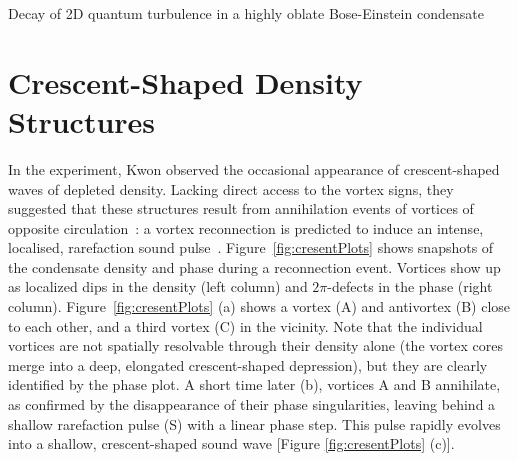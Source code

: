\begin{chapter}{\label{cha:shin}Decay of 2D quantum turbulence in a highly oblate Bose-Einstein condensate}
\section{Crescent-Shaped Density Structures}
In the experiment, Kwon {\etal}observed the occasional appearance of crescent-shaped waves of 
depleted density.  Lacking direct access to the vortex signs,
they suggested that these structures result from
annihilation events of vortices of opposite 
circulation~\citep{nazarenko_onorato_07,rorai_skreenivasan_12,prabhakar_singh_13}: a vortex reconnection is predicted to 
induce an intense, localised, rarefaction 
sound pulse~\cite{leadbeater,zuccher}.  
Figure~\ref{fig:cresentPlots} shows snapshots of the condensate density 
and phase during a reconnection event. Vortices show up as localized dips 
in the density (left column) and $2 \pi$-defects in the phase (right column). 
Figure~\ref{fig:cresentPlots} (a) shows a vortex (A) and antivortex (B) 
close to each other, and a third vortex (C) in the vicinity.
Note that the individual vortices are not spatially resolvable 
through their density alone (the vortex cores merge into a deep, elongated 
crescent-shaped depression), but they are clearly identified by the 
phase plot.  A short time later (b), vortices A and B annihilate, 
as confirmed by the disappearance of their phase singularities, 
leaving behind a shallow rarefaction pulse (S) with a linear phase step.  
This pulse rapidly evolves into a shallow, 
crescent-shaped sound wave [Figure \ref{fig:cresentPlots} (c)].  


\end{chapter}
